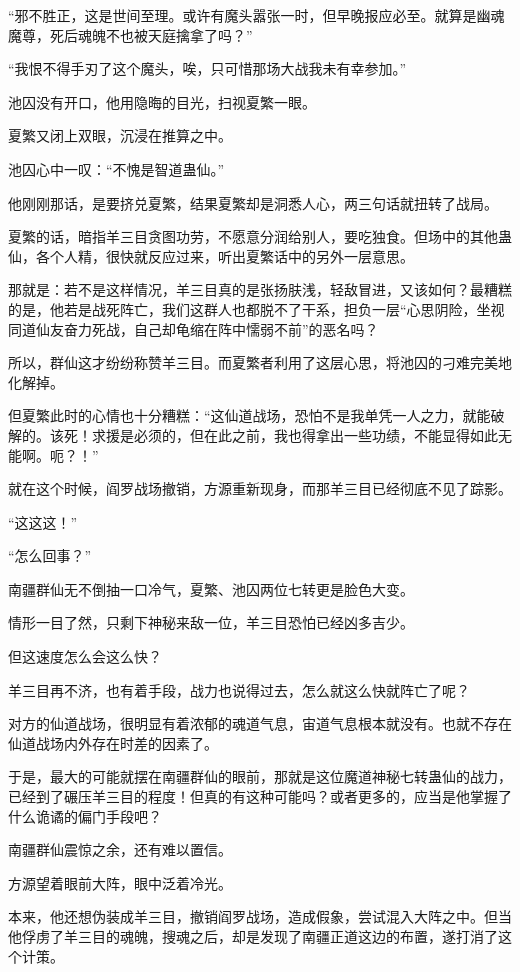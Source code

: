 \begin{this_body}
“邪不胜正，这是世间至理。或许有魔头嚣张一时，但早晚报应必至。就算是幽魂魔尊，死后魂魄不也被天庭擒拿了吗？”

“我恨不得手刃了这个魔头，唉，只可惜那场大战我未有幸参加。”

池囚没有开口，他用隐晦的目光，扫视夏繁一眼。

夏繁又闭上双眼，沉浸在推算之中。

池囚心中一叹：“不愧是智道蛊仙。”

他刚刚那话，是要挤兑夏繁，结果夏繁却是洞悉人心，两三句话就扭转了战局。

夏繁的话，暗指羊三目贪图功劳，不愿意分润给别人，要吃独食。但场中的其他蛊仙，各个人精，很快就反应过来，听出夏繁话中的另外一层意思。

那就是：若不是这样情况，羊三目真的是张扬肤浅，轻敌冒进，又该如何？最糟糕的是，他若是战死阵亡，我们这群人也都脱不了干系，担负一层“心思阴险，坐视同道仙友奋力死战，自己却龟缩在阵中懦弱不前”的恶名吗？

所以，群仙这才纷纷称赞羊三目。而夏繁者利用了这层心思，将池囚的刁难完美地化解掉。

但夏繁此时的心情也十分糟糕：“这仙道战场，恐怕不是我单凭一人之力，就能破解的。该死！求援是必须的，但在此之前，我也得拿出一些功绩，不能显得如此无能啊。呃？！”

就在这个时候，阎罗战场撤销，方源重新现身，而那羊三目已经彻底不见了踪影。

“这这这！”

“怎么回事？”

南疆群仙无不倒抽一口冷气，夏繁、池囚两位七转更是脸色大变。

情形一目了然，只剩下神秘来敌一位，羊三目恐怕已经凶多吉少。

但这速度怎么会这么快？

羊三目再不济，也有着手段，战力也说得过去，怎么就这么快就阵亡了呢？

对方的仙道战场，很明显有着浓郁的魂道气息，宙道气息根本就没有。也就不存在仙道战场内外存在时差的因素了。

于是，最大的可能就摆在南疆群仙的眼前，那就是这位魔道神秘七转蛊仙的战力，已经到了碾压羊三目的程度！但真的有这种可能吗？或者更多的，应当是他掌握了什么诡谲的偏门手段吧？

南疆群仙震惊之余，还有难以置信。

方源望着眼前大阵，眼中泛着冷光。

本来，他还想伪装成羊三目，撤销阎罗战场，造成假象，尝试混入大阵之中。但当他俘虏了羊三目的魂魄，搜魂之后，却是发现了南疆正道这边的布置，遂打消了这个计策。


\end{this_body}
